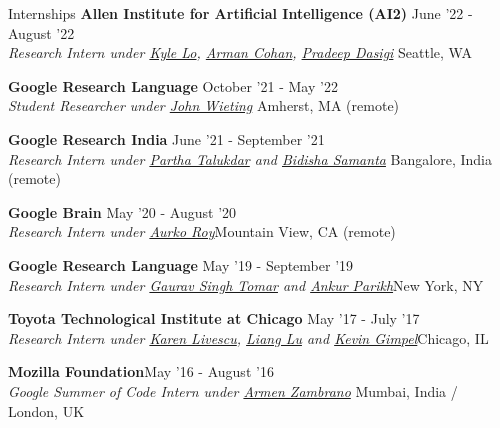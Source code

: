 \documentclass{resume} %
\begin{document}
\begin{rSection}{Internships}
\vspace*{0.1in}
{\bf Allen Institute for Artificial Intelligence (AI2)} { \hfill June '22 - August '22}\\ \textit{Research Intern under \href{https://kyleclo.github.io/}{Kyle Lo}, \href{http://armancohan.com/}{Arman Cohan}, \href{https://pdasigi.github.io/}{Pradeep Dasigi}} {\hfill Seattle, WA}

{\bf Google Research Language} { \hfill October '21 - May '22}\\ \textit{Student Researcher under \href{https://scholar.google.com/citations?user=Z0dGdDUAAAAJ&hl=en}{John Wieting}} {\hfill Amherst, MA (remote)}

{\bf Google Research India} { \hfill June '21 - September '21}\\ \textit{Research Intern under \href{https://scholar.google.com/citations?user=CIZwXAcAAAAJ&hl=en}{Partha Talukdar} and \href{https://sites.google.com/view/bidisha-samanta/}{Bidisha Samanta}} {\hfill Bangalore, India (remote)}

{\bf Google Brain} { \hfill May '20 - August '20}\\ \textit{Research Intern under \href{https://sites.google.com/site/royaurko/}{Aurko Roy}}{\hfill Mountain View, CA (remote)}

{\bf Google Research Language}{ \hfill May '19 - September '19}\\ \textit{Research Intern under \href{https://ai.google/research/people/GauravSinghTomar/}{Gaurav Singh Tomar} and \href{www.ankurparikh.com}{Ankur Parikh}}{\hfill New York, NY}

{\bf Toyota Technological Institute at Chicago}{ \hfill May '17 - July '17}\\ \textit{Research Intern under \href{http://ttic.uchicago.edu/~klivescu/}{Karen Livescu}, \href{http://ttic.uchicago.edu/~llu/}{Liang Lu} and \href{http://ttic.uchicago.edu/~kgimpel/}{Kevin Gimpel}}{\hfill Chicago, IL}

{\bf Mozilla Foundation}{\hfill May '16 - August '16} \\ \textit{Google Summer of Code Intern under \href{https://github.com/armenzg}{Armen Zambrano}}{ \hfill Mumbai, India / London, UK}
\end{rSection}
\end{document}
